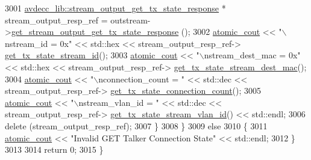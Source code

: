 \begin{DoxyCode}
3001             \hyperlink{classavdecc__lib_1_1stream__output__get__tx__state__response}{avdecc\_lib::stream\_output\_get\_tx\_state\_response} 
      * stream\_output\_resp\_ref = outstream->\hyperlink{classavdecc__lib_1_1stream__output__descriptor_ad352ecf636c3497e245f402b2a369f51}{get\_stream\_output\_get\_tx\_state\_response}
      ();
3002             \hyperlink{cmd__line_8h_a0bc38ccc65c79ba06c6fcd7b4bf554c3}{atomic\_cout} << \textcolor{stringliteral}{"\(\backslash\)nstream\_id = 0x"} << std::hex << stream\_output\_resp\_ref->
      \hyperlink{classavdecc__lib_1_1stream__output__get__tx__state__response_a70413bbd0422049658122c5103e0d948}{get\_tx\_state\_stream\_id}();
3003             \hyperlink{cmd__line_8h_a0bc38ccc65c79ba06c6fcd7b4bf554c3}{atomic\_cout} << \textcolor{stringliteral}{"\(\backslash\)nstream\_dest\_mac = 0x"} << std::hex << stream\_output\_resp\_ref->
      \hyperlink{classavdecc__lib_1_1stream__output__get__tx__state__response_a0afd9b8a130eca8b72c62dd327a4922c}{get\_tx\_state\_stream\_dest\_mac}();
3004             \hyperlink{cmd__line_8h_a0bc38ccc65c79ba06c6fcd7b4bf554c3}{atomic\_cout} << \textcolor{stringliteral}{"\(\backslash\)nconnection\_count = "} << std::dec << stream\_output\_resp\_ref->
      \hyperlink{classavdecc__lib_1_1stream__output__get__tx__state__response_aa12c38f566d4d5f8263278d2f926ae68}{get\_tx\_state\_connection\_count}();
3005             \hyperlink{cmd__line_8h_a0bc38ccc65c79ba06c6fcd7b4bf554c3}{atomic\_cout} << \textcolor{stringliteral}{"\(\backslash\)nstream\_vlan\_id = "} << std::dec << stream\_output\_resp\_ref->
      \hyperlink{classavdecc__lib_1_1stream__output__get__tx__state__response_a6965d78cf766e94db678a379dc96ab91}{get\_tx\_state\_stream\_vlan\_id}() << std::endl;
3006             \textcolor{keyword}{delete} (stream\_output\_resp\_ref);
3007         \}
3008     \}
3009     \textcolor{keywordflow}{else}
3010     \{
3011         \hyperlink{cmd__line_8h_a0bc38ccc65c79ba06c6fcd7b4bf554c3}{atomic\_cout} << \textcolor{stringliteral}{"Invalid GET Talker Connection State"} << std::endl;
3012     \}
3013 
3014     \textcolor{keywordflow}{return} 0;
3015 \}
\end{DoxyCode}


